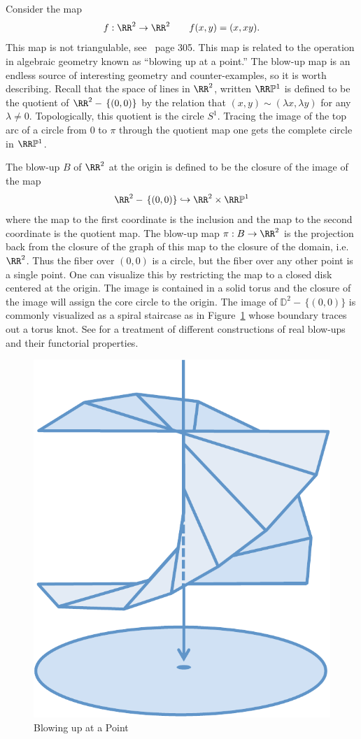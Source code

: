 \begin{ex}\label{ex:blowup}
	Consider the map
	\[
		f:\RR^2\to\RR^2 \qquad f(x,y)=(x,xy).
	\]
	This map is not triangulable, see~\cite{shiota} page 305. This map is related to the operation in algebraic geometry known as ``blowing up at a point.'' The blow-up map is an endless source of interesting geometry and counter-examples, so it is worth describing. Recall that the space of lines in $\RR^2$, written $\RR\mathbb{P}^1$ is defined to be the quotient of $\RR^2-\,\{(0,0)\}$ by the relation that $(x,y)\sim (\lambda x,\lambda y)$ for any $\lambda\neq 0$. Topologically, this quotient is the circle $S^1$. Tracing the image of the top arc of a circle from $0$ to $\pi$ through the quotient map one gets the complete circle in $\RR\mathbb{P}^1$.
	
	The blow-up $B$ of $\RR^2$ at the origin is defined to be the closure of the image of the map
	\[
		\RR^2-\,\{(0,0)\} \hookrightarrow \RR^2\times \RR\mathbb{P}^1
	\]
	where the map to the first coordinate is the inclusion and the map to the second coordinate is the quotient map. The blow-up map $\pi:B\to\RR^2$ is the projection back from the closure of the graph of this map to the closure of the domain, i.e. $\RR^2$. Thus the fiber over $(0,0)$ is a circle, but the fiber over any other point is a single point. One can visualize this by restricting the map to a closed disk centered at the origin. The image is contained in a solid torus and the closure of the image will assign the core circle to the origin. The image of $\mathbb{D}^2-\,\{(0,0)\}$ is commonly visualized as a spiral staircase as in Figure~\ref{fig:blowup} whose boundary traces out a torus knot. See \cite{arone-blowup} for a treatment of different constructions of real blow-ups and their functorial properties.
\end{ex}

\begin{figure}
\centering
\includegraphics[width=.7\textwidth]{blowup_closed_disc.pdf}
\caption{Blowing up at a Point}
\label{fig:blowup}
\end{figure}


